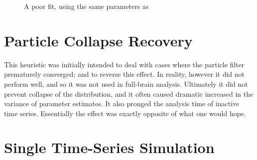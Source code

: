 \begin{figure}
\caption{A poor fit, using the same parameters as }
\label{fig:param2_var}
\end{figure}

\section{Particle Collapse Recovery}
This heuristic was initially intended to deal with cases where the particle
filter prematurely converged; and to reverse this effect. In reality, however
it did not perform well, and so it was not used in full-brain analysis. Ultimately
it did not prevent collapse of the distribution, and it often caused dramatic
increased in the variance of parameter estimates. It also pronged the analysis
time of inactive time series. Essentially the effect was exactly opposite of what
one would hope.


\section{Single Time-Series Simulation}


